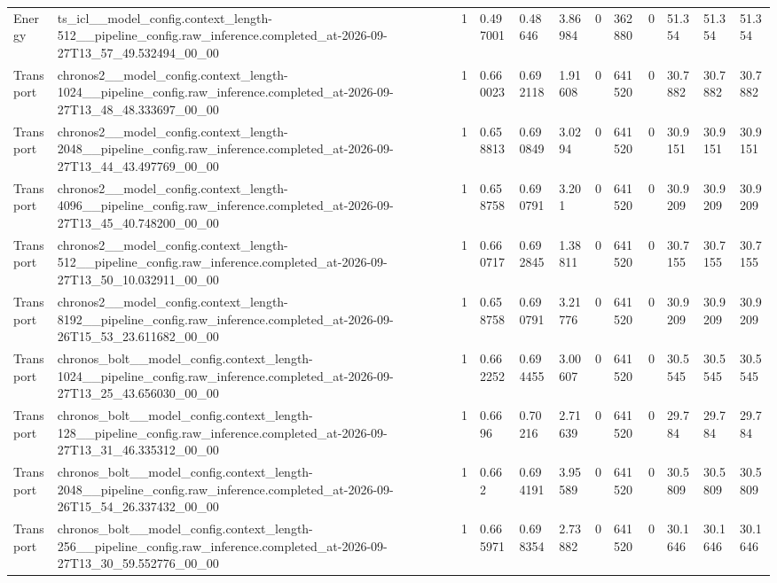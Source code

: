 \begin{tabular}{llllllllllll}
Energy & ts\_icl\_\_model\_config.context\_length-512\_\_pipeline\_config.raw\_inference.completed\_at-2026-09-27T13\_57\_49.532494\_00\_00 & 1 & 0.497001 & 0.48646 & 3.86984 & 0 & 362880 & 0 & 51.354 & 51.354 & 51.354 \\
Transport & chronos2\_\_model\_config.context\_length-1024\_\_pipeline\_config.raw\_inference.completed\_at-2026-09-27T13\_48\_48.333697\_00\_00 & 1 & 0.660023 & 0.692118 & 1.91608 & 0 & 641520 & 0 & 30.7882 & 30.7882 & 30.7882 \\
Transport & chronos2\_\_model\_config.context\_length-2048\_\_pipeline\_config.raw\_inference.completed\_at-2026-09-27T13\_44\_43.497769\_00\_00 & 1 & 0.658813 & 0.690849 & 3.0294 & 0 & 641520 & 0 & 30.9151 & 30.9151 & 30.9151 \\
Transport & chronos2\_\_model\_config.context\_length-4096\_\_pipeline\_config.raw\_inference.completed\_at-2026-09-27T13\_45\_40.748200\_00\_00 & 1 & 0.658758 & 0.690791 & 3.201 & 0 & 641520 & 0 & 30.9209 & 30.9209 & 30.9209 \\
Transport & chronos2\_\_model\_config.context\_length-512\_\_pipeline\_config.raw\_inference.completed\_at-2026-09-27T13\_50\_10.032911\_00\_00 & 1 & 0.660717 & 0.692845 & 1.38811 & 0 & 641520 & 0 & 30.7155 & 30.7155 & 30.7155 \\
Transport & chronos2\_\_model\_config.context\_length-8192\_\_pipeline\_config.raw\_inference.completed\_at-2026-09-26T15\_53\_23.611682\_00\_00 & 1 & 0.658758 & 0.690791 & 3.21776 & 0 & 641520 & 0 & 30.9209 & 30.9209 & 30.9209 \\
Transport & chronos\_bolt\_\_model\_config.context\_length-1024\_\_pipeline\_config.raw\_inference.completed\_at-2026-09-27T13\_25\_43.656030\_00\_00 & 1 & 0.662252 & 0.694455 & 3.00607 & 0 & 641520 & 0 & 30.5545 & 30.5545 & 30.5545 \\
Transport & chronos\_bolt\_\_model\_config.context\_length-128\_\_pipeline\_config.raw\_inference.completed\_at-2026-09-27T13\_31\_46.335312\_00\_00 & 1 & 0.6696 & 0.70216 & 2.71639 & 0 & 641520 & 0 & 29.784 & 29.784 & 29.784 \\
Transport & chronos\_bolt\_\_model\_config.context\_length-2048\_\_pipeline\_config.raw\_inference.completed\_at-2026-09-26T15\_54\_26.337432\_00\_00 & 1 & 0.662 & 0.694191 & 3.95589 & 0 & 641520 & 0 & 30.5809 & 30.5809 & 30.5809 \\
Transport & chronos\_bolt\_\_model\_config.context\_length-256\_\_pipeline\_config.raw\_inference.completed\_at-2026-09-27T13\_30\_59.552776\_00\_00 & 1 & 0.665971 & 0.698354 & 2.73882 & 0 & 641520 & 0 & 30.1646 & 30.1646 & 30.1646 \\

\end{tabular}
